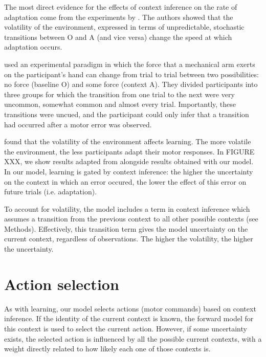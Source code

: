 \documentclass[a4paper,doc,floatsintext,natbib]{apa6}
\begin{document}
The most direct evidence for the effects of context inference on the rate of adaptation come from the experiments by \cite{Herzfeld_memory_2014}. The authors showed that the volatility of the environment, expressed in terms of unpredictable, stochastic transitions between O and A (and vice versa) change the speed at which adaptation occurs.

\cite{Herzfeld_memory_2014} used an experimental paradigm in which the force that a mechanical arm exerts on the participant's hand can change from trial to trial between two possibilities: no force (baseline O) and some force (context A). They divided participants into three groups for which the transition from one trial to the next were very uncommon, somewhat common and almost every trial. Importantly, these transitions were uncued, and the participant could only infer that a transition had occurred after a motor error was observed.

\cite{Herzfeld_memory_2014} found that the volatility of the environment affects learning. The more volatile the environment, the less participants adapt their motor responses. In FIGURE XXX, we show results adapted from \cite{Herzfeld_memory_2014} alongside results obtained with our model. In our model, learning is gated by context inference: the higher the uncertainty on the context in which an error occured, the lower the effect of this error on future trials (i.e. adaptation).

To account for volatility, the model includes a term in context inference which assumes a transition from the previous context to all other possible contexts (see Methods). Effectively, this transition term gives the model uncertainty on the current context, regardless of observations. The higher the volatility, the higher the uncertainty.

\section{Action selection}
As with learning, our model selects actions (motor commands) based on context inference. If the identity of the current context is known, the forward model for this context is used to select the current action. However, if some uncertainty exists, the selected action is influenced by all the possible current contexts, with a weight directly related to how likely each one of those contexts is.
\end{document}
